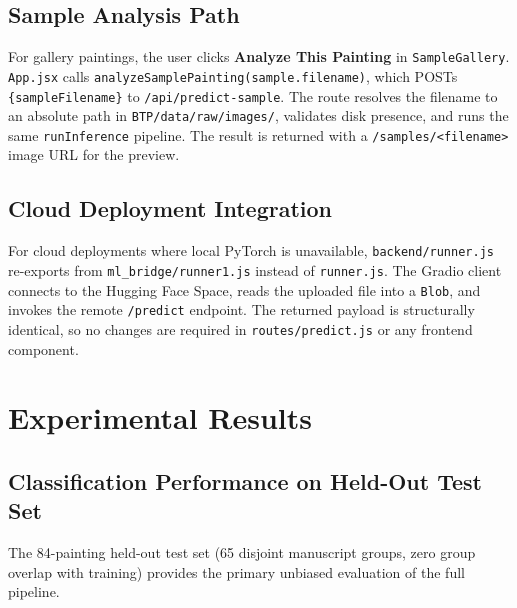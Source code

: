 \documentclass[12pt, a4paper, twoside]{article}
\begin{document}
\subsection{Sample Analysis Path}

For gallery paintings, the user clicks \textbf{Analyze This Painting} in \texttt{SampleGallery}. \texttt{App.jsx} calls \texttt{analyzeSamplePainting(sample.filename)}, which POSTs \texttt{\{sampleFilename\}} to \texttt{/api/predict-sample}. The route resolves the filename to an absolute path in \texttt{BTP/data/raw/images/}, validates disk presence, and runs the same \texttt{runInference} pipeline. The result is returned with a \texttt{/samples/<filename>} image URL for the preview.

\subsection{Cloud Deployment Integration}

For cloud deployments where local PyTorch is unavailable, \texttt{backend/runner.js} re-exports from \texttt{ml\_bridge/runner1.js} instead of \texttt{runner.js}. The Gradio client connects to the Hugging Face Space, reads the uploaded file into a \texttt{Blob}, and invokes the remote \texttt{/predict} endpoint. The returned payload is structurally identical, so no changes are required in \texttt{routes/predict.js} or any frontend component.

\section{Experimental Results}
\label{sec:results}

\subsection{Classification Performance on Held-Out Test Set}

The 84-painting held-out test set (65 disjoint manuscript groups, zero group overlap with training) provides the primary unbiased evaluation of the full pipeline.
\end{document}
